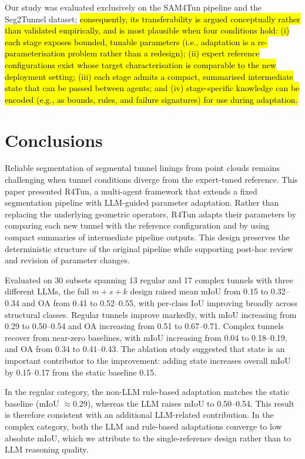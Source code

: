 \documentclass[a4paper,fleqn]{cas-dc}
\begin{document}
{Our study was evaluated exclusively on the SAM4Tun pipeline and the Seg2Tunnel dataset; \hl{consequently, its transferability is argued conceptually rather than validated empirically, and is most plausible when four conditions hold: (i) each stage exposes bounded, tunable parameters (i.e., adaptation is a re-parameterisation problem rather than a redesign); (ii) expert reference configurations exist whose target characterisation is comparable to the new deployment setting; (iii) each stage admits a compact, summarised intermediate state that can be passed between agents; and (iv) stage-specific knowledge can be encoded (e.g., as bounds, rules, and failure signatures) for use during adaptation.} 

\section{Conclusions}\label{sec:conclusions}

Reliable segmentation of segmental tunnel linings from point clouds remains challenging when tunnel conditions diverge from the expert-tuned reference. This paper presented R4Tun, a multi-agent framework that extends a fixed segmentation pipeline with LLM-guided parameter adaptation. Rather than replacing the underlying geometric operators, R4Tun adapts their parameters by comparing each new tunnel with the reference configuration and by using compact summaries of intermediate pipeline outputs. This design preserves the deterministic structure of the original pipeline while supporting post-hoc review and revision of parameter changes.

Evaluated on 30 subsets spanning 13 regular and 17 complex tunnels with three different LLMs, the full \mbox{$m+s+k$} design raised mean mIoU from 0.15 to 0.32--0.34 and OA from 0.41 to 0.52--0.55, with per-class IoU improving broadly across structural classes. Regular tunnels improve markedly, with mIoU increasing from 0.29 to 0.50--0.54 and OA increasing from 0.51 to 0.67--0.71. Complex tunnels recover from near-zero baselines, with mIoU increasing from 0.04 to 0.18--0.19, and OA from 0.34 to 0.41--0.43. The ablation study suggested that state is an important contributor to the improvement: adding state increases overall mIoU by 0.15--0.17 from the static baseline 0.15.

In the regular category, the non-LLM rule-based adaptation matches the static baseline (mIoU $\approx 0.29$), whereas the LLM raises mIoU to 0.50--0.54. This result is therefore consistent with an additional LLM-related contribution. In the complex category, both the LLM and rule-based adaptations converge to low absolute mIoU, which we attribute to the single-reference design rather than to LLM reasoning quality.

}
\end{document}
